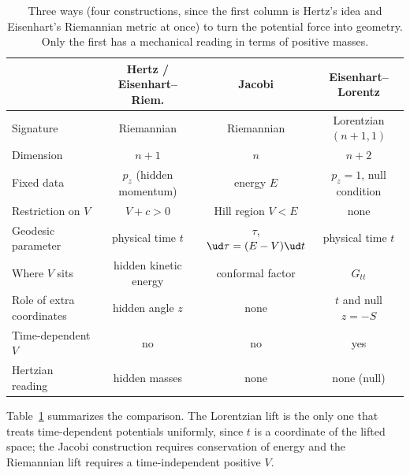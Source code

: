 \begin{table}[t]
\centering
\small
\setlength{\tabcolsep}{4pt}
\begin{tabular}{@{}lccc@{}}
\toprule
 & Hertz / Eisenhart--Riem. & Jacobi & Eisenhart--Lorentz\\
\midrule
Signature & Riemannian & Riemannian & Lorentzian $(n{+}1,1)$\\
Dimension & $n+1$ & $n$ & $n+2$\\
Fixed data & $p_z$ (hidden momentum) & energy $E$ & $p_z=1$, null condition\\
Restriction on $V$ & $V+c>0$ & Hill region $V<E$ & none\\
Geodesic parameter & physical time $t$ & $\tau$, $\ud\tau=(E-V)\ud t$ & physical time $t$\\
Where $V$ sits & hidden kinetic energy & conformal factor & $G_{tt}$\\
Role of extra coordinates & hidden angle $z$ & none & $t$ and null $z=-S$\\
Time-dependent $V$ & no & no & yes\\
Hertzian reading & hidden masses & none & none (null)\\
\bottomrule
\end{tabular}
\caption{Three ways (four constructions, since the first column is Hertz's idea and Eisenhart's
Riemannian metric at once) to turn the potential force into geometry. Only the first has a
mechanical reading in terms of positive masses.}
\label{tab:hz-compare}
\end{table}

Table~\ref{tab:hz-compare} summarizes the comparison. The Lorentzian lift is the only one that
treats time-dependent potentials uniformly, since $t$ is a coordinate of the lifted
space; the Jacobi construction requires conservation of energy and the Riemannian lift
requires a time-independent positive $V$.

